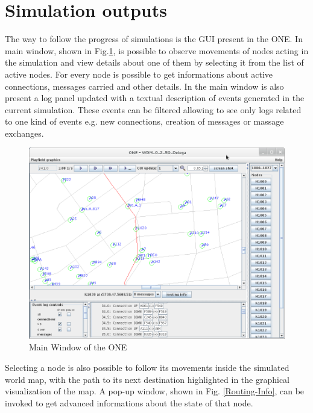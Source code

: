 \section{Simulation outputs}
The way to follow the progress of simulations is the GUI present in the ONE. In main window, shown in Fig.\ref{Schermata-ONE}, is possible to observe movements of nodes acting in the simulation and view details about one of them by selecting it from the list of active nodes. For every node is possible to get informations about active connections, messages carried and other details. In the main window is also present a log panel updated with a textual description of events generated in the current simulation. These events can be filtered allowing to see only logs related to one kind of events e.g. new connections, creation of messages or massage exchanges.
\\
\begin{figure}[htpb]
  \begin{center}
    \includegraphics[scale=0.4]{5-simulatore/img/Schermata-ONE.png}
    \caption[Main window]{Main Window of the ONE}    
    \label{Schermata-ONE}
  \end{center}
\end{figure}

Selecting a node is also possible to follow its movements inside the simulated world map, with the path to its next destination highlighted in the graphical visualization of the map. A pop-up window, shown in Fig. \ref{Routing-Info}, can be invoked to get advanced informations about the state of that node.
\\

